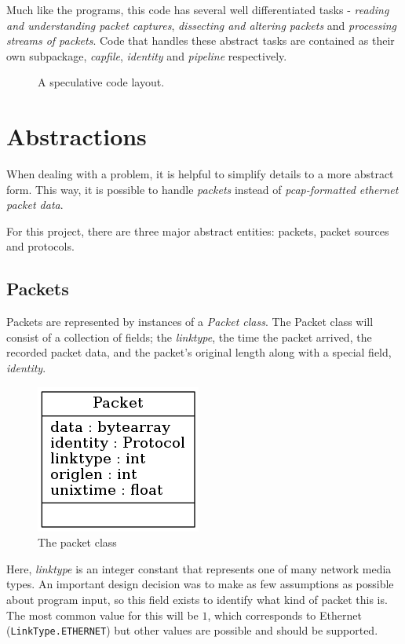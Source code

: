 \documentclass[10pt,a4paper,notitlepage]{report}
\begin{document}
Much like the programs, this code has several well differentiated tasks - \emph{reading and understanding packet captures}, \emph{dissecting and altering packets} and \emph{processing streams of packets}. Code that handles these abstract tasks are contained as their own subpackage, \emph{capfile}, \emph{identity} and \emph{pipeline} respectively.

\begin{figure}[H]
\caption{A speculative code layout.}
\label{fig:codelayout}
\end{figure}
\section{Abstractions}
When dealing with a problem, it is helpful to simplify details to a more abstract form. This way, it is possible to handle \emph{packets} instead of \emph{pcap-formatted ethernet packet data}.

For this project, there are three major abstract entities: packets, packet sources and protocols.

\subsection{Packets}
Packets are represented by instances of a \emph{Packet class}. The Packet class will consist of a collection of fields; the \emph{linktype}, the time the packet arrived, the recorded packet data, and the packet's original length along with a special field, \emph{identity}.

\begin{figure}
\center
\includegraphics[scale=0.7]{diagrams/packet.png}
\caption{The packet class}
\end{figure}

Here, \emph{linktype} is an integer constant that represents one of many network media types. An important design decision was to make as few assumptions as possible about program input, so this field exists to identify what kind of packet this is. The most common value for this will be $1$, which corresponds to Ethernet (\texttt{LinkType.ETHERNET}) but other values are possible and should be supported.
\end{document}
